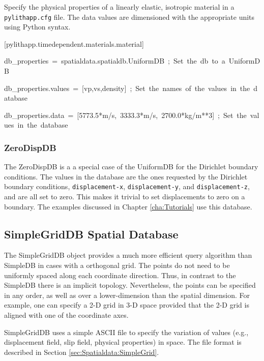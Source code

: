 Specify the physical properties of a linearly elastic, isotropic material
in a \texttt{pylithapp.cfg} file. The data values are dimensioned
with the appropriate units using Python syntax.
\begin{lyxcode}
{\footnotesize{}{[}pylithapp.timedependent.materials.material{]}}{\footnotesize \par}

{\footnotesize{}db\_properties~=~spatialdata.spatialdb.UniformDB~;~Set~the~db~to~a~UniformDB}{\footnotesize \par}

{\footnotesize{}db\_properties.values~=~{[}vp,vs,density{]}~;~Set~the~names~of~the~values~in~the~database}{\footnotesize \par}

{\footnotesize{}db\_properties.data~=~{[}5773.5{*}m/s,~3333.3{*}m/s,~2700.0{*}kg/m{*}{*}3{]}~;~Set~the~values~in~the~database}{\footnotesize \par}
\end{lyxcode}

\subsubsection{ZeroDispDB}

The ZeroDispDB is a a special case of the UniformDB for the Dirichlet
boundary conditions. The values in the database are the ones requested
by the Dirichlet boundary conditions, \texttt{displacement-x}, \texttt{displacement-y},
and \texttt{displacement-z}, and are all set to zero. This makes it
trivial to set displacements to zero on a boundary. The examples discussed
in Chapter \ref{cha:Tutorials} use this database.


\subsection{SimpleGridDB Spatial Database}

The SimpleGridDB object provides a much more efficient query algorithm
than SimpleDB in cases with a orthogonal grid. The points do not need
to be uniformly spaced along each coordinate direction. Thus, in contrast
to the SimpleDB there is an implicit topology. Nevertheless, the points
can be specified in any order, as well as over a lower-dimension than
the spatial dimension. For example, one can specify a 2-D grid in
3-D space provided that the 2-D grid is aligned with one of the coordinate
axes. 

SimpleGridDB uses a simple ASCII file to specify the variation of
values (e.g., displacement field, slip field, physical properties)
in space. The file format is described in Section \ref{sec:Spatialdata:SimpleGrid}. 

